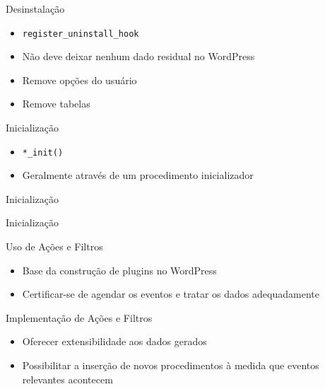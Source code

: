 \documentclass{beamer}
\begin{document}
\begin{frame}{Desinstalação}
\begin{itemize}
  \pause \item \texttt{register\_uninstall\_hook}
  \pause \item Não deve deixar nenhum dado residual no WordPress
  \pause \item Remove opções do usuário
  \pause \item Remove tabelas
\end{itemize}
\end{frame}

\begin{frame}{Inicialização}
\begin{itemize}
  \pause \item \texttt{*\_init()}
  \pause \item Geralmente através de um procedimento inicializador
\end{itemize}
\end{frame}

\begin{frame}{Inicialização}
  
  \pause 
\end{frame}

\begin{frame}{Inicialização}
  
  \pause 
\end{frame}

\begin{frame}{Uso de Ações e Filtros}
\begin{itemize}
  \pause \item Base da construção de plugins no WordPress
  \pause \item Certificar-se de agendar os eventos e
    tratar os dados adequadamente
\end{itemize}
\end{frame}

\begin{frame}{Implementação de Ações e Filtros}
\begin{itemize}
  \pause \item Oferecer extensibilidade aos dados gerados
  \pause \item Possibilitar a inserção de novos procedimentos à medida
    que eventos relevantes acontecem
\end{itemize}
\end{frame}
\end{document}
